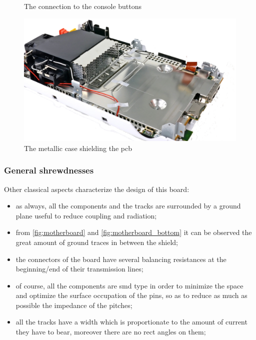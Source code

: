 \documentclass[11pt,a4paper,titlepage]{article}
\begin{document}
\begin{figure}[h]
\begin{minipage}{.5 \textwidth}
						\caption{The connection to the console buttons}
						\label{fig:button}
				  \end{minipage}
				  \hspace{5mm}
				  \begin{minipage}{.5 \textwidth}
						\centering
						\includegraphics[width = .8\textwidth]{shield.png}
						\caption{The metallic case shielding the \gls{pcb}}
						\label{fig:metalliccase}
				  \end{minipage}
				\end{figure}

		  \subsubsection{General shrewdnesses}
				Other classical aspects characterize the design of this board:
				\begin{itemize}
				  \item as always, all the components and the tracks are surrounded by a ground plane useful to reduce coupling and radiation;
				  \item from \autoref{fig:motherboard} and \autoref{fig:motherboard_bottom} it can be observed the great amount of ground traces in between the shield;
				  \item the connectors of the board have several balancing resistances at the beginning/end of their transmission lines;
				  \item of course, all the components are \gls{smd} type in order to minimize the space and optimize the surface occupation of the pins, so as to reduce as much as possible the impedance of the pitches;
				  \item all the tracks have a width which is proportionate to the amount of current they have to bear, moreover there are no rect angles on them;
				\end{itemize}
\end{document}
